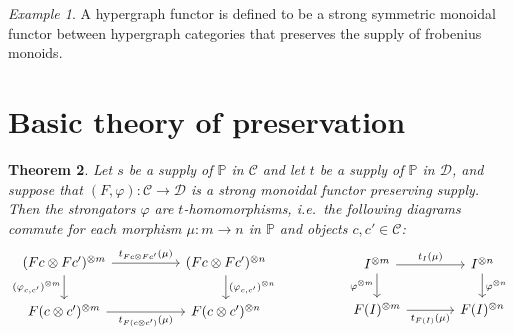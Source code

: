 \documentclass[11pt, oneside, article]{memoir}
\theoremstyle{plain}
\newtheorem{theorem}{Theorem}[chapter]
\theoremstyle{definition}
\theoremstyle{remark}
\newtheorem{example}[theorem]{Example}
\newcommand{\cat}[1]{\mathcal{#1}}%
\newcommand{\tpow}[1]{^{\otimes #1}}
\newcommand{\pp}{\mathbb{P}}
\begin{document}
\begin{example}
  A hypergraph functor is defined to be a strong symmetric monoidal functor between hypergraph categories that preserves the supply of frobenius monoids.
\end{example}


\section{Basic theory of preservation}\label{sec.preserve_thms}


\begin{theorem}\label{thm.pres_supp_strongators_homo}
Let $s$ be a supply of $\pp$ in $\cat{C}$ and let $t$ be a supply of $\pp$ in $\cat{D}$, and suppose that $(F,\varphi)\colon\cat{C}\to\cat{D}$ is a strong monoidal functor preserving supply. Then the strongators $\varphi$ are $t$-homomorphisms, i.e.\ the following diagrams commute for each morphism $\mu\colon m\to n$ in $\pp$ and objects $c,c'\in\cat{C}$:
\[
\begin{tikzcd}[column sep=50pt]
	(Fc\otimes Fc')\tpow{m}
		\ar[r, "t_{Fc\otimes Fc'}(\mu)"]\ar[d, "(\varphi_{c,c'})\tpow{m}"']&
 	(Fc\otimes Fc')\tpow{n}\ar[d, "(\varphi_{c,c'})\tpow{n}"]\\
  F(c\otimes c')\tpow{m}\ar[r, "t_{F(c\otimes c')}(\mu)"']&
  F(c\otimes c')\tpow{n}
\end{tikzcd}
\hspace{.7in}
\begin{tikzcd}[column sep=35pt]
	I\tpow{m}
		\ar[r, "t_I(\mu)"]\ar[d, "\varphi\tpow{m}"']&
 	I\tpow{n}\ar[d, "\varphi\tpow{n}"]\\
  F(I)\tpow{m}\ar[r, "t_{F(I)}(\mu)"']&
  F(I)\tpow{n}
\end{tikzcd}
\]
\end{theorem}
\end{document}
